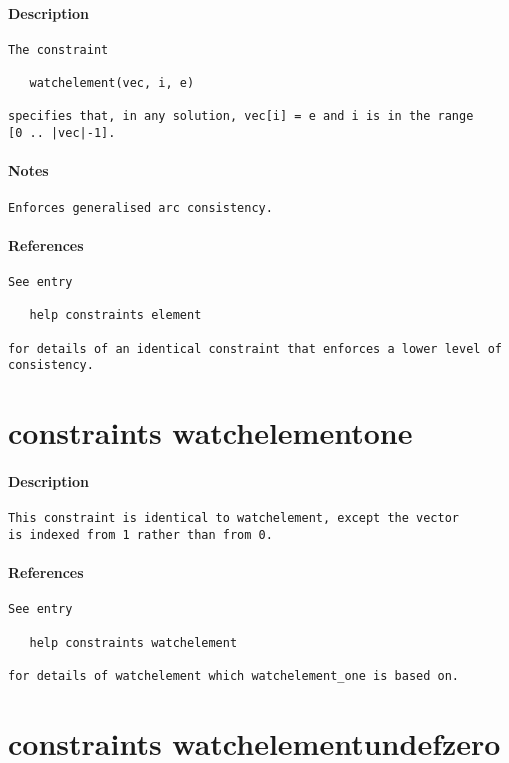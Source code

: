 \paragraph{Description}
{\footnotesize
\begin{verbatim}
The constraint

   watchelement(vec, i, e)

specifies that, in any solution, vec[i] = e and i is in the range
[0 .. |vec|-1].
\end{verbatim}
}
\paragraph{Notes}
{\footnotesize
\begin{verbatim}
Enforces generalised arc consistency.
\end{verbatim}
}
\paragraph{References}
{\footnotesize
\begin{verbatim}
See entry

   help constraints element

for details of an identical constraint that enforces a lower level of
consistency.
\end{verbatim}
}
\section{constraints watchelement\textunderscore one}
\paragraph{Description}
{\footnotesize
\begin{verbatim}
This constraint is identical to watchelement, except the vector
is indexed from 1 rather than from 0.
\end{verbatim}
}
\paragraph{References}
{\footnotesize
\begin{verbatim}
See entry

   help constraints watchelement

for details of watchelement which watchelement_one is based on.
\end{verbatim}
}
\section{constraints watchelement\textunderscore undefzero}

